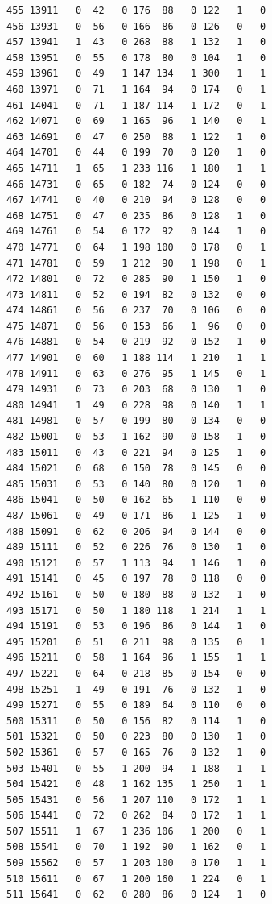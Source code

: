 \documentclass[
  letterpaper,
  DIV=11,
  numbers=noendperiod]{scrreprt}
\begin{document}
\begin{verbatim}
455 13911   0  42   0 176  88   0 122   1   0
456 13931   0  56   0 166  86   0 126   0   0
457 13941   1  43   0 268  88   1 132   1   0
458 13951   0  55   0 178  80   0 104   1   0
459 13961   0  49   1 147 134   1 300   1   1
460 13971   0  71   1 164  94   0 174   0   1
461 14041   0  71   1 187 114   1 172   0   1
462 14071   0  69   1 165  96   1 140   0   1
463 14691   0  47   0 250  88   1 122   1   0
464 14701   0  44   0 199  70   0 120   1   0
465 14711   1  65   1 233 116   1 180   1   1
466 14731   0  65   0 182  74   0 124   0   0
467 14741   0  40   0 210  94   0 128   0   0
468 14751   0  47   0 235  86   0 128   1   0
469 14761   0  54   0 172  92   0 144   1   0
470 14771   0  64   1 198 100   0 178   0   1
471 14781   0  59   1 212  90   1 198   0   1
472 14801   0  72   0 285  90   1 150   1   0
473 14811   0  52   0 194  82   0 132   0   0
474 14861   0  56   0 237  70   0 106   0   0
475 14871   0  56   0 153  66   1  96   0   0
476 14881   0  54   0 219  92   0 152   1   0
477 14901   0  60   1 188 114   1 210   1   1
478 14911   0  63   0 276  95   1 145   0   1
479 14931   0  73   0 203  68   0 130   1   0
480 14941   1  49   0 228  98   0 140   1   1
481 14981   0  57   0 199  80   0 134   0   0
482 15001   0  53   1 162  90   0 158   1   0
483 15011   0  43   0 221  94   0 125   1   0
484 15021   0  68   0 150  78   0 145   0   0
485 15031   0  53   0 140  80   0 120   1   0
486 15041   0  50   0 162  65   1 110   0   0
487 15061   0  49   0 171  86   1 125   1   0
488 15091   0  62   0 206  94   0 144   0   0
489 15111   0  52   0 226  76   0 130   1   0
490 15121   0  57   1 113  94   1 146   1   0
491 15141   0  45   0 197  78   0 118   0   0
492 15161   0  50   0 180  88   0 132   1   0
493 15171   0  50   1 180 118   1 214   1   1
494 15191   0  53   0 196  86   0 144   1   0
495 15201   0  51   0 211  98   0 135   0   1
496 15211   0  58   1 164  96   1 155   1   1
497 15221   0  64   0 218  85   0 154   0   0
498 15251   1  49   0 191  76   0 132   1   0
499 15271   0  55   0 189  64   0 110   0   0
500 15311   0  50   0 156  82   0 114   1   0
501 15321   0  50   0 223  80   0 130   1   0
502 15361   0  57   0 165  76   0 132   1   0
503 15401   0  55   1 200  94   1 188   1   1
504 15421   0  48   1 162 135   1 250   1   1
505 15431   0  56   1 207 110   0 172   1   1
506 15441   0  72   0 262  84   0 172   1   1
507 15511   1  67   1 236 106   1 200   0   1
508 15541   0  70   1 192  90   1 162   0   1
509 15562   0  57   1 203 100   0 170   1   1
510 15611   0  67   1 200 160   1 224   0   1
511 15641   0  62   0 280  86   0 124   1   0

\end{verbatim}
\end{document}
